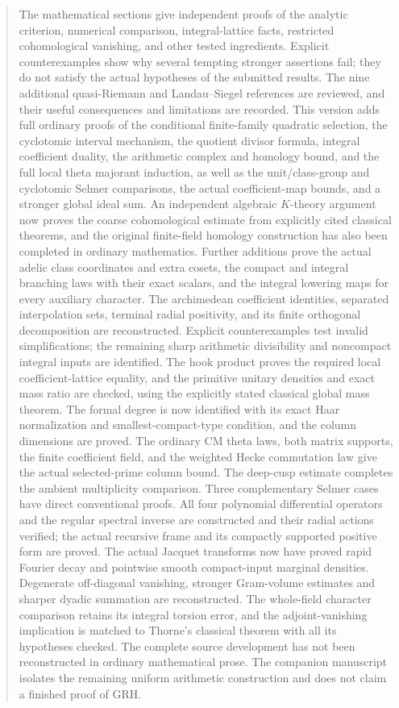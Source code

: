 \documentclass[11pt,a4paper]{article}
\theoremstyle{remark}
\begin{document}
\begin{abstract}
The mathematical sections give independent proofs of the analytic
criterion, numerical comparison, integral-lattice facts, restricted
cohomological vanishing, and other tested ingredients. Explicit
counterexamples show why several tempting stronger assertions fail;
they do not satisfy the actual hypotheses of the submitted results.
The nine additional quasi-Riemann and Landau--Siegel references are
reviewed, and their useful consequences and limitations are recorded.
This version adds full ordinary proofs of the conditional finite-family
quadratic selection, the cyclotomic interval mechanism, the quotient
divisor formula, integral coefficient duality, the arithmetic complex
and homology bound, and the full local theta majorant induction,
as well as the unit/class-group and cyclotomic Selmer comparisons,
the actual coefficient-map bounds, and a stronger global ideal sum.
An independent algebraic $K$-theory argument now proves the coarse
cohomological estimate from explicitly cited classical theorems,
and the original finite-field homology construction has also been
completed in ordinary mathematics. Further additions prove the actual
adelic class coordinates and extra cosets, the compact and integral
branching laws with their exact scalars, and the integral lowering maps
for every auxiliary character. The archimedean coefficient identities,
separated interpolation sets, terminal radial positivity, and its
finite orthogonal decomposition are reconstructed. Explicit
counterexamples test invalid simplifications; the remaining sharp
arithmetic divisibility and noncompact integral inputs are identified.
The hook product proves the required local coefficient-lattice equality,
and the primitive unitary densities and exact mass ratio are checked,
using the explicitly stated classical global mass theorem.
The formal degree is now identified with its exact Haar normalization
and smallest-compact-type condition, and the column dimensions are
proved. The ordinary CM theta laws, both matrix supports, the
finite coefficient field, and the weighted Hecke commutation law
give the actual selected-prime column bound. The deep-cusp estimate
completes the ambient multiplicity comparison. Three complementary
Selmer cases have direct conventional proofs. All four polynomial
differential operators and the regular spectral inverse are
constructed and their radial actions verified; the actual recursive
frame and its compactly supported positive form are proved.
The actual Jacquet transforms now have proved rapid Fourier decay and
pointwise smooth compact-input marginal densities. Degenerate off-diagonal
vanishing, stronger Gram-volume estimates and sharper dyadic summation
are reconstructed. The whole-field character comparison retains its
integral torsion error, and the adjoint-vanishing implication is matched
to Thorne's classical theorem with all its hypotheses checked.
The complete source development has not been reconstructed in ordinary
mathematical prose. The companion manuscript isolates the remaining
uniform arithmetic construction and does not claim a finished proof
of GRH.
\end{abstract}
\setcounter{tocdepth}{1}
\hypersetup{bookmarksdepth=2}
\begingroup\small\setlength{\parskip}{0pt}
\tableofcontents
\endgroup
\newpage
\end{document}
